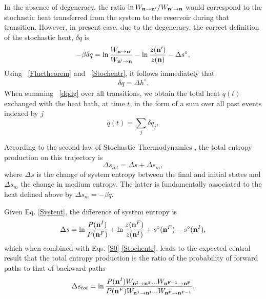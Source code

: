 \documentclass[
	amsmath,
	amssymb,
	a4paper,
	aip,		%
	jcp,		%
	reprint, twocolumn  %
	fleqn,
	showpacs,
	floatfix
]{revtex4-1}
\newcommand{\be}{\begin{equation}}
\newcommand{\ee}{\end{equation}}
\begin{document}
In the absence of degeneracy, the ratio $\ln W_{\bold{n} \rightarrow  \bold{n'}} / W_{\bold{n'} \rightarrow  \bold{n}}$ would correspond 
to the stochastic heat 
transferred from the system to the reservoir during that transition. However, in present case,  due to the degeneracy, the 
correct definition of the stochastic heat, $\delta q$ is
\begin{equation}
	\begin{split}
- \beta \delta q=  \ln \frac{W_{\bold{n} \rightarrow  \bold{n'}} }{W_{\bold{n'} \rightarrow  \bold{n}} } 
- \ln \frac{z(\bold{n'})}{z(\bold{n})} - \Delta s^{\circ} ,
\label{Stochentr}
\end{split} 
\end{equation}
Using ~\eqref{Fluctheorem} and ~\eqref{Stochentr}, it follows immediately that
\begin{equation}
	\begin{split}
\delta q= \Delta h^{\circ}.
\label{dqdg}
\end{split} 
\end{equation}
When summing ~\eqref{dqdg} over all transitions, we obtain the total heat $q(t)$ exchanged with the heat bath, 
at time $t$, in the form of a sum over all past events indexed by $j$
\be
q(t)=\sum_{j} \delta q_j ,
\ee

According to the second law of Stochastic Thermodynamics \cite{Seifert2012,Esposito201}, the total entropy production on this trajectory is
\be
\Delta s_{tot}=\Delta s + \Delta s_m,
\ee
where $\Delta s$ is the change of system entropy between the final and initial states and $\Delta s_m$ the change 
in medium entropy. The latter is fundamentally associated to the heat defined above by $\Delta s_m=-\beta q$.



Given Eq. \eqref{Systent}, the difference of system entropy is
\be
\Delta s= \ln \frac{P(\bold{n}^I)}{P(\bold{n}^F)} + \ln \frac{z(\bold{n}^F)}{z(\bold{n}^I)} + 
s^{\circ}(\bold{n}^{F}) - s^{\circ}(\bold{n}^{I}),
\label{Systent-change} 
\ee
which when combined with Eqs. \eqref{S0}-\eqref{Stochentr}, leads to the expected central result that 
the total entropy production is the ratio of the 
probability of forward paths to that of backward paths
\be
\Delta s_{tot}=  \ln \frac{P(\bold{n}^I) W_{\bold{n^{I}} \rightarrow  \bold{n^{1}}}  ...W_{\bold{n^{F-1}} \rightarrow  \bold{n^{F}}}   }
{P(\bold{n}^F) W_{ \bold{n^{1}} \rightarrow  \bold{n^{I}}}  ...W_{\bold{n^{F}} \rightarrow  \bold{n^{F-1}}}  }.
\ee
 
\end{document}
